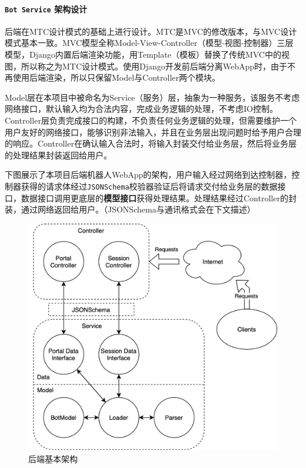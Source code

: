 \documentclass[hyperref]{ctexart}
\begin{document}
\paragraph{\texttt{Bot Service} 架构设计}
后端在MTC设计模式的基础上进行设计。MTC是MVC的修改版本，与MVC设计模式基本一致。MVC模型全称Model-View-Controller（模型-视图-控制器）三层模型，Django内置后端渲染功能，用Template（模板）替换了传统MVC中的视图，所以称之为MTC设计模式。使用Django开发前后端分离WebApp时，由于不再使用后端渲染，所以只保留Model与Controller两个模块。
\par Model层在本项目中被命名为Service（服务）层，抽象为一种服务，该服务不考虑网络接口，默认输入均为合法内容，完成业务逻辑的处理，不考虑IO控制。Controller层负责完成接口的构建，不负责任何业务逻辑的处理，但需要维护一个用户友好的网络接口，能够识别非法输入，并且在业务层出现问题时给予用户合理的响应。Controller在确认输入合法时，将输入封装交付给业务层，然后将业务层的处理结果封装返回给用户。
\par 下图展示了本项目后端机器人WebApp的架构，用户输入经过网络到达控制器，控制器获得的请求体经过\texttt{JSONSchema}校验器验证后将请求交付给业务层的数据接口，数据接口调用更底层的{\bf 模型接口}获得处理结果。处理结果经过Controller的封装，通过网络返回给用户。（JSONSchema与通讯格式会在下文描述）
\begin{figure}[H]
    \centering
    \includegraphics[scale=0.13]{figure/4.png}
    \caption{后端基本架构}
    \label{Fig.1.4}
\end{figure}
\end{document}
